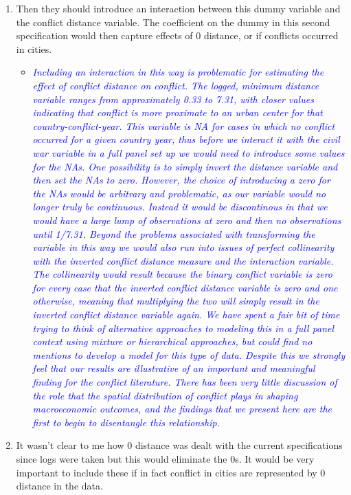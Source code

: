 \begin{enumerate}
\item Then they should introduce an interaction between this dummy variable and the conflict distance variable. The coefficient on the dummy in this second specification would then capture effects of 0 distance, or if conflicts occurred in cities.

\begin{itemize}
\item \textcolor{blue}{\emph{
	Including an interaction in this way is problematic for estimating the effect of conflict distance on conflict. The logged, minimum distance variable ranges from approximately 0.33 to 7.31, with closer values indicating that conflict is more proximate to an urban center for that country-conflict-year. This variable is NA for cases in which no conflict occurred for a given country year, thus before we interact it with the civil war variable in a full panel set up we would need to introduce some values for the NAs. One possibility is to simply invert the distance variable and then set the NAs to zero. However, the choice of introducing a zero for the NAs would be arbitrary and problematic, as our variable would no longer truly be continuous. Instead it would be discontinous in that we would have a large lump of observations at zero and then no observations until 1/7.31. Beyond the problems associated with transforming the variable in this way we would also run into issues of perfect collinearity with the inverted conflict distance measure and the interaction variable. The collinearity would result because the binary conflict variable is zero for every case that the inverted conflict distance variable is zero and one otherwise, meaning that multiplying the two will simply result in the inverted conflict distance variable again. 
	We have spent a fair bit of time trying to think of alternative approaches to modeling this in a full panel context using mixture or hierarchical approaches, but could find no mentions to develop a model for this type of data. 
	Despite this we strongly feel that our results are illustrative of an important and meaningful finding for the conflict literature. There has been very little discussion of the role that the spatial distribution of conflict plays in shaping macroeconomic outcomes, and the findings that we present here are the first to begin to disentangle this relationship.
}}
\end{itemize}

\item It wasn’t clear to me how 0 distance was dealt with the current specifications since logs were taken but this would eliminate the 0s. It would be very important to include these if in fact conflict in cities are represented by 0 distance in the data.


\end{enumerate}
